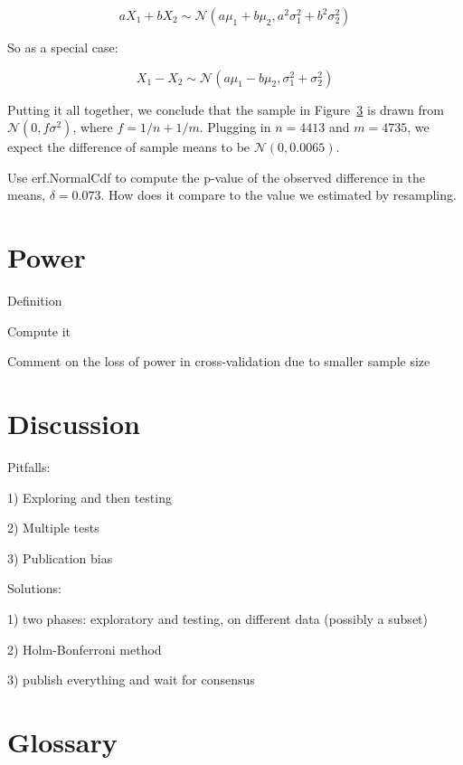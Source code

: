 \documentclass[12pt]{book}
\begin{document}
\[ aX_1 + bX_2 \sim \mathcal{N} (a\mu_1 + b\mu_2, 
                                 a^2\sigma_1^2 + b^2\sigma_2^2) \]

So as a special case:

\[ X_1 - X_2 \sim \mathcal{N} (a\mu_1 - b\mu_2, 
                               \sigma_1^2 + \sigma_2^2) \]

Putting it all together, we conclude that the sample in Figure~\ref{}
is drawn from $\mathcal{N} (0, f \sigma^2)$, where $f = 1/n + 1/m$.
Plugging in $n=4413$ and $m=4735$, we expect the difference of sample
means to be $\mathcal{N} (0, 0.0065)$.

\begin{ex}

Use erf.NormalCdf to compute the p-value of the observed difference
in the means, $\delta=0.073$.  How does it compare to the value
we estimated by resampling.

\end{ex}



\section{Power}

Definition

Compute it

Comment on the loss of power in cross-validation due to smaller sample size 


\section{Discussion}

Pitfalls:

1) Exploring and then testing

2) Multiple tests

3) Publication bias


Solutions:

1) two phases: exploratory and testing, on different data (possibly a subset)

2) Holm-Bonferroni method

3) publish everything and wait for consensus




\section{Glossary}
\end{document}
